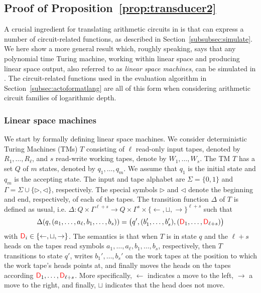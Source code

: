 \subsection{Proof of Proposition~\ref{prop:transducer2}}
A crucial ingredient for translating arithmetic circuits in \langfor is that \langfor
can express a number of circuit-related functions, as described in Section~\ref{subsubsec:simulate}.
We here show a more general result which, roughly speaking, says that any 
polynomial time Turing machine, working within linear space and producing linear space output, also
referred to as \textit{linear space machines}, 
can be simulated in \langfor. The circuit-related functions used in the evaluation algorithm in Section~\ref{subsec:actoformatlang}
are all of this form when considering arithmetic circuit families of logarithmic depth.

\subsubsection{Linear space machines}\label{subsubsec:linearspace}
We start by formally defining linear space machines. We consider  deterministic Turing Machines (TMs) $T$ 
consisting of $\ell$ read-only input tapes, denoted by $R_1,\ldots,R_\ell$, and
$s$ read-write working tapes, denote by $W_1,\ldots,W_s$. The TM $T$ has a set 
$Q$ of $m$ states, denoted by $q_1,\ldots,q_m$. We assume that $q_1$ is the initial state and $q_m$ is the accepting state.
The input and tape alphabet are $\Sigma=\{0,1\}$ and $\Gamma=\Sigma\cup\{\rhd,\lhd\}$, respectively. The special 
symbols $\rhd$ and $\lhd$ denote the beginning and end, respectively, of each of the tapes.
The transition function $\Delta$ of $T$ is defined as usual, i.e. 
$\Delta:Q\times \Gamma^{\ell+s} \to Q\times \Gamma^{s}\times \{\leftarrow,\sqcup,\rightarrow\}^{\ell+s}$ 
such that
$$
\Delta(q,(a_1,\ldots,a_{\ell},b_1, \ldots, b_s))=\bigl(q',(b_1',\ldots, b'_s),({\color{red} \mathsf{D}}_1,\ldots,{\color{red} \mathsf{D}}_{\ell+s})\bigr)
$$
with ${\color{red} \mathsf{D}}_i\in \{\leftarrow,\sqcup,\rightarrow\}$. The semantics is that when $T$ is in state $q$ and the $\ell+s$ 
heads on the tapes read symbols $a_1,\ldots,a_{\ell},b_1, \ldots, b_s$, respectively, then $T$ transitions to state $q'$,
writes $b_1', \ldots, b_s'$ on the work tapes at the position to which the work
tape's heads points at, and finally moves the heads on the tapes according 
${\color{red} \mathsf{D}}_1,\ldots,{\color{red} \mathsf{D}}_{\ell+s}$. More specifically, $\leftarrow$  indicates a move to the left, 
$\rightarrow$ a move to the right, and finally, $\sqcup$ indicates that the head does not move.

